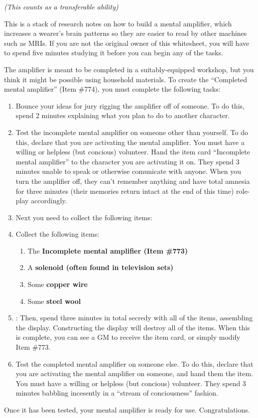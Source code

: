 \documentclass[white]{guildcamp1}
\begin{document}
\name{\wMentalAmplifier{}}

\emph{(This counts as a transferable ability)}

This is a stack of research notes on how to build a mental amplifier, which increases a wearer's brain patterns so they are easier to read by other machines such as MRIs. If you are not the original owner of this whitesheet, you will have to spend five minutes studying it before you can begin any of the tasks.

The amplifier is meant to be completed in a suitably-equipped workshop, but you think it might be possible using household materials. To create the ``Completed mental amplifier'' (Item \#774), you must complete the following tasks: 

\begin{enumerate}
\item Bounce your ideas for jury rigging the amplifier off of someone. To do this, spend 2 minutes explaining what you plan to do to another character.
\item Test the incomplete mental amplifier on someone other than yourself. To do this, declare that you are activating the mental amplifier. You must have a willing or helpless (but concious) volunteer. Hand the item card ``Incomplete mental amplifier'' to the character you are activating it on. They spend 3 minutes unable to speak or otherwise comunicate with anyone. When you turn the amplifier off, they can't remember anything and have total amnesia for three minutes (their memories return intact at the end of this time) role-play accordingly. 
\item  Next you need to collect the following items:
\item Collect the following items:
\begin{enumerate}
\item The  \bf{Incomplete mental amplifier} (Item \#773)
\item A \bf{solenoid} (often found in television sets)
\item Some \bf{copper wire}
\item Some \bf{steel wool}
\end{enumerate}
\item: Then, spend three minutes in total secredy with all of the items, assembling the display. Constructing the display will destroy all of the items.  When this is complete, you can see a GM to receive the item card, or simply modify Item \#773.
\item Test the completed mental amplifier on someone else. To do this, declare that you are activating the mental amplifier on someone, and hand them the item. You must have a willing or helpless (but concious) volunteer. They spend 3 minutes babbling incesently in a ``stream of conciousness'' fashion.
\end{enumerate}

Once it has been tested, your mental amplifier is ready for use. Congratulations.
\end{document}
